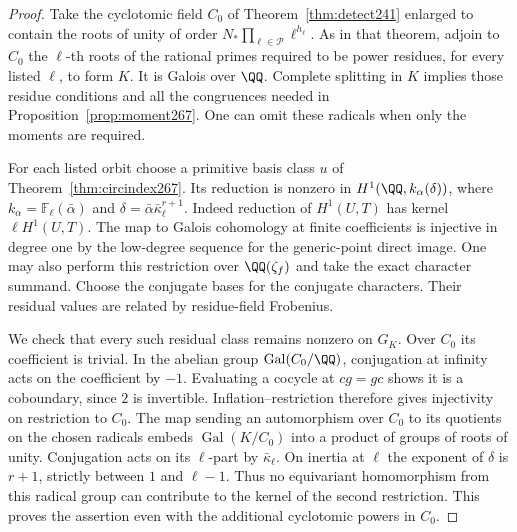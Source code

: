 \documentclass[a4paper,11pt]{article}
\theoremstyle{definition}
\theoremstyle{remark}
\numberwithin{equation}{section}
\begin{document}
\begin{proof}
Take the cyclotomic field \(C_0\) of Theorem~\ref{thm:detect241}
enlarged to contain the roots of unity of order
\(N_*\prod_{\ell\in\mathcal P}\ell^{h_\ell}\). As in that
theorem, adjoin to \(C_0\) the \(\ell\)-th roots of the rational
primes required to be power residues, for every listed \(\ell\),
to form \(K\). It is Galois over \(\QQ\). Complete splitting in
\(K\) implies those residue conditions and all the congruences
needed in Proposition~\ref{prop:moment267}. One can omit these
radicals when only the moments are required.

For each listed orbit choose a primitive basis class \(u\) of
Theorem~\ref{thm:circindex267}. Its reduction is nonzero in
\(H^1(\QQ,k_\alpha(\delta))\), where
\(k_\alpha=\mathbb F_\ell(\bar\alpha)\) and
\(\delta=\bar\alpha\bar\kappa_\ell^{r+1}\).
Indeed reduction of \(H^1(U,T)\) has kernel \(\ell H^1(U,T)\).
The map to Galois cohomology at finite coefficients is
injective in degree one by the low-degree sequence for the
generic-point direct image. One may also perform this
restriction over \(\QQ(\zeta_f)\) and take the exact character
summand. Choose the conjugate bases for the conjugate characters.
Their residual values are related by residue-field Frobenius.

We check that every such residual class remains nonzero on
\(G_K\). Over \(C_0\) its coefficient is trivial. In the
abelian group \(\operatorname{Gal}(C_0/\QQ)\), conjugation at
infinity acts on the coefficient by \(-1\). Evaluating a
cocycle at \(cg=gc\) shows it is a coboundary, since \(2\)
is invertible. Inflation--restriction therefore gives
injectivity on restriction to \(C_0\).
The map sending an automorphism over \(C_0\) to its quotients
on the chosen radicals embeds \(\operatorname{Gal}(K/C_0)\)
into a product of groups of roots of unity. Conjugation acts
on its \(\ell\)-part by \(\bar\kappa_\ell\). On inertia at
\(\ell\) the exponent of \(\delta\) is \(r+1\), strictly
between \(1\) and \(\ell-1\). Thus no equivariant homomorphism
from this radical group can contribute to the kernel of the
second restriction. This proves the assertion even with the
additional cyclotomic powers in \(C_0\).


\end{proof}
\end{document}
